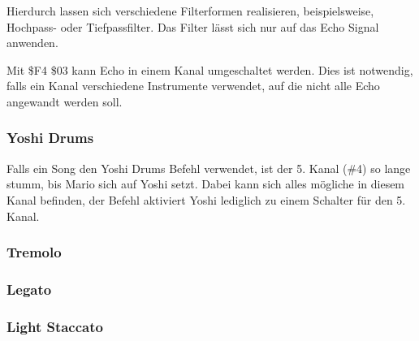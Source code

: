 \medskip

Hierdurch lassen sich verschiedene Filterformen realisieren, beispielsweise, Hochpass- oder Tiefpassfilter.
Das Filter lässt sich nur auf das Echo Signal anwenden.

\bigskip

Mit \$F4 \$03 kann Echo in einem Kanal umgeschaltet werden. Dies ist notwendig, falls ein Kanal verschiedene Instrumente verwendet, auf die nicht alle Echo angewandt werden soll.

\subsubsection{Yoshi Drums}

Falls ein Song den Yoshi Drums Befehl verwendet, ist der 5. Kanal (\#4) so lange stumm, bis Mario sich auf Yoshi setzt. Dabei kann sich alles mögliche in diesem Kanal befinden, der Befehl aktiviert Yoshi lediglich zu einem Schalter für den 5. Kanal.
\medskip



\medskip



\subsubsection{Tremolo}
\subsubsection{Legato}
\subsubsection{Light Staccato}
